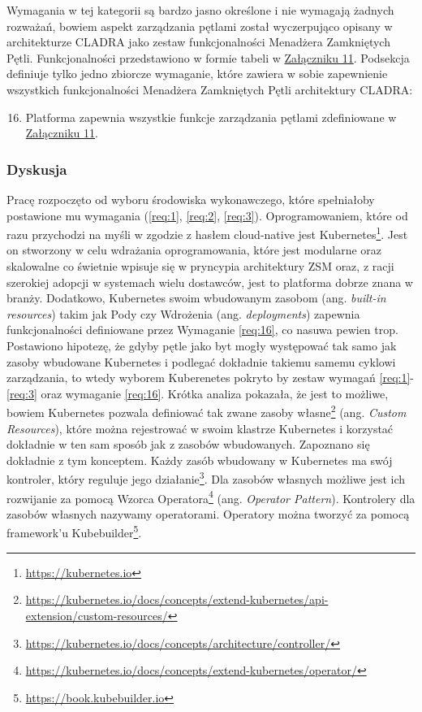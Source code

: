 Wymagania w tej kategorii są bardzo jasno określone i nie wymagają żadnych rozważań, bowiem aspekt zarządzania pętlami został wyczerpująco opisany w architekturze CLADRA jako zestaw funkcjonalności Menadżera Zamkniętych Pętli. Funkcjonalności przedstawiono w formie tabeli w \hyperlink{appendix:11}{Załączniku 11}. Podsekcja definiuje tylko jedno zbiorcze wymaganie, które zawiera w sobie zapewnienie wszystkich funkcjonalności Menadżera Zamkniętych Pętli architektury CLADRA:

\begin{enumerate}
    \setcounter{enumi}{15} 
    \item \label{req:16} Platforma zapewnia wszystkie funkcje zarządzania pętlami zdefiniowane w \hyperlink{appendix:11}{Załączniku 11}.
\end{enumerate}

\subsubsection{Dyskusja}

Pracę rozpoczęto od wyboru środowiska wykonawczego, które spełniałoby postawione mu wymagania (\ref{req:1}, \ref{req:2}, \ref{req:3}). Oprogramowaniem, które od razu przychodzi na myśli w zgodzie z hasłem cloud-native jest Kubernetes\footnote{\url{https://kubernetes.io}}. Jest on stworzony w celu wdrażania oprogramowania, które jest modularne oraz skalowalne co świetnie wpisuje się w pryncypia architektury ZSM oraz, z racji szerokiej adopcji w systemach wielu dostawców, jest to platforma dobrze znana w branży. Dodatkowo, Kubernetes swoim wbudowanym zasobom (ang. \textit{built-in resources}) takim jak Pody czy Wdrożenia (ang. \textit{deployments}) zapewnia funkcjonalności definiowane przez Wymaganie \ref{req:16}, co nasuwa pewien trop. Postawiono hipotezę, że gdyby pętle jako byt mogły występować tak samo jak zasoby wbudowane Kubernetes i podlegać dokładnie takiemu samemu cyklowi zarządzania, to wtedy wyborem Kuberenetes pokryto by zestaw wymagań \ref{req:1}-\ref{req:3} oraz wymaganie \ref{req:16}. Krótka analiza pokazała, że jest to możliwe, bowiem Kubernetes pozwala definiować tak zwane zasoby własne\footnote{\url{https://kubernetes.io/docs/concepts/extend-kubernetes/api-extension/custom-resources/}} (ang. \textit{Custom Resources}), które można rejestrować w swoim klastrze Kubernetes i korzystać dokładnie w ten sam sposób jak z zasobów wbudowanych. Zapoznano się dokładnie z tym konceptem. Każdy zasób wbudowany w Kubernetes ma swój kontroler, który reguluje jego działanie\footnote{\url{https://kubernetes.io/docs/concepts/architecture/controller/}}. Dla zasobów własnych możliwe jest ich rozwijanie za pomocą Wzorca Operatora\footnote{\url{https://kubernetes.io/docs/concepts/extend-kubernetes/operator/}} (ang. \textit{Operator Pattern}). Kontrolery dla zasobów własnych nazywamy operatorami. Operatory można tworzyć za pomocą framework'u Kubebuilder\footnote{\url{https://book.kubebuilder.io}}.

